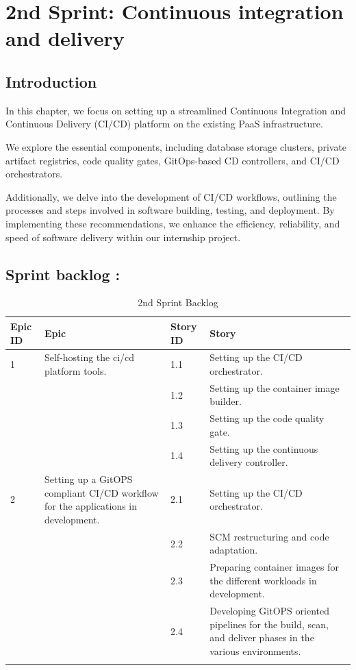 \graphicspath{{./assets/}}
\setcounter{mtc}{3}
\chapter{2nd Sprint: Continuous integration and delivery }

\minitoc
\newpage
\section*{Introduction}

In this chapter, we focus on setting up a streamlined Continuous Integration and Continuous Delivery (CI/CD) platform on the existing PaaS infrastructure.

We explore the essential components, including database storage clusters, private artifact registries, code quality gates, GitOps-based CD controllers, and CI/CD orchestrators.

Additionally, we delve into the development of CI/CD workflows, outlining the processes and steps involved in software building, testing, and deployment. By implementing these recommendations, we enhance the efficiency, reliability, and speed of software delivery within our internship project.

\section{Sprint backlog :}

\begin{longtable}[H]{|m{1.5cm}|m{3cm}|m{1.5cm}|m{9cm}|}
\hline
{\textbf{Epic ID}} & {\textbf{Epic}} & {\textbf{Story ID}} & {\textbf{Story}}\\
\hline
1  & Self-hosting the ci/cd platform tools.  &  1.1	 & Setting up the CI/CD orchestrator.\\
\cline{3-4}
& & 1.2 & Setting up the container image builder. \\
\cline{3-4}
& & 1.3	& Setting up the code quality gate. \\
\cline{3-4}
& & 1.4	& Setting up the continuous delivery controller. \\
\cline{3-4}
\hline
2  & Setting up a GitOPS compliant CI/CD workflow for the applications in development.  &  2.1	 & Setting up the CI/CD orchestrator.\\
\cline{3-4}
& & 2.2 & SCM restructuring and code adaptation. \\
\cline{3-4}
& & 2.3	& Preparing container images for the different workloads in development.  \\
\cline{3-4}
& & 2.4	& Developing GitOPS oriented pipelines for the build, scan, and deliver phases in the various environments.  \\
\cline{3-4}
\hline
\caption{2nd Sprint Backlog}
\end{longtable}

